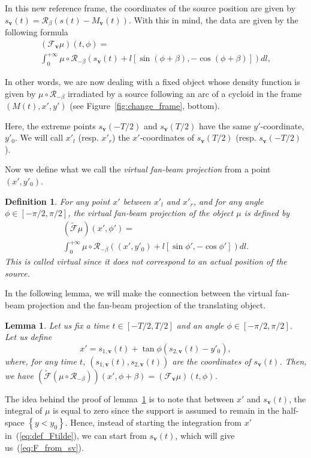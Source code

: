 \documentclass[letterpaper,twocolumn]{IEEEtran}
\newcommand{\bv}{\mathbf{v}}
\newcommand{\Mbv}{M_{\mathbf{v}}}
\newcommand{\Tbv}{\mathcal{F}_{\mathbf{v}}}
\newcommand{\sbv}{s_{\mathbf{v}}}
\newtheorem{definition}{Definition}
\newtheorem{lemma}{Lemma}
\begin{document}
In this new reference frame, the coordinates of the source position are given by $\sbv(t)=\mathcal{R}_{\beta} \left( s(t)-\Mbv(t) \right)$. With this in mind, the data are given by the following formula
\begin{multline}
	(\Tbv\mu)(t,\phi) = \\
	\int_0^{+\infty} \mu \circ \mathcal{R}_{-\beta} \left( s_{\bv}(t) + l \left[ \sin (\phi + \beta), -\cos (\phi + \beta) \right] \right) dl,
\label{eq:F_from_sv}
\end{multline}

In other words, we are now dealing with a fixed object whose density function is given by $\mu \circ \mathcal{R}_{-\beta}$ irradiated by a source following an arc of a cycloid in the frame $\left(M(t), x', y'\right)$ (see Figure~\ref{fig:change_frame}, bottom).

Here, the extreme points $\sbv(-T/2)$ and $\sbv(T/2)$ have the same $y'$-coordinate, $y'_0$. We will call $x'_l$ (resp. $x'_r$) the $x'$-coordinates of $\sbv(T/2)$ (resp. $\sbv(-T/2)$).

Now we define what we call the \emph{virtual fan-beam projection} from a point $(x',y'_0)$.
\begin{definition}
	For any point $x'$ between $x'_l$ and $x'_r$, and for any angle $\phi \in \left[ -\pi/2, \pi/2\right]$, the \emph{virtual fan-beam projection} of the object $\mu$ is defined by
\begin{multline}
	\left( \tilde{\mathcal{F}} \mu	\right)(x',\phi') = \\
	\int_0^{+\infty} \mu \circ \mathcal{R}_{-\beta} \left( (x',y'_0) + l \left[ \sin \phi', -\cos \phi' \right] \right) dl.
\label{eq:def_Ftilde}
\end{multline}
This is called \emph{virtual} since it does not correspond to an actual position of the source.
\end{definition}

In the following lemma, we will make the connection between the virtual fan-beam projection and the fan-beam projection of the translating object.
\begin{lemma}
	Let us fix a time $t \in \left[ -T/2, T/2\right]$ and an angle $\phi \in \left[ -\pi/2, \pi/2\right]$. Let us define
	\begin{equation}
		x' = s_{1,\bv}(t) + \tan \phi \left( s_{2,\bv}(t) - y'_0 \right),
		\label{eq:x'}
	\end{equation}
	where, for any time $t$, $\left( s_{1,\bv}(t), s_{2,\bv}(t) \right)$ are the coordinates of $\sbv(t)$.
	Then, we have $\left( \tilde{\mathcal{F}} \left( \mu \circ \mathcal{R}_{-\beta} \right) \right)(x',\phi + \beta) = \left( \Tbv \mu \right)(t,\phi)$.
\label{lem:T_x_t}
\end{lemma}
The idea behind the proof of lemma~\ref{lem:T_x_t} is to note that between $x'$ and $\sbv(t)$, the integral of $\mu$ is equal to zero since the support is assumed to remain in the half-space $\left\{ y<y_0 \right\}$. Hence, instead of starting the integration from $x'$ in~(\ref{eq:def_Ftilde}), we can start from $\sbv(t)$, which will give us~(\ref{eq:F_from_sv}).
\end{document}
